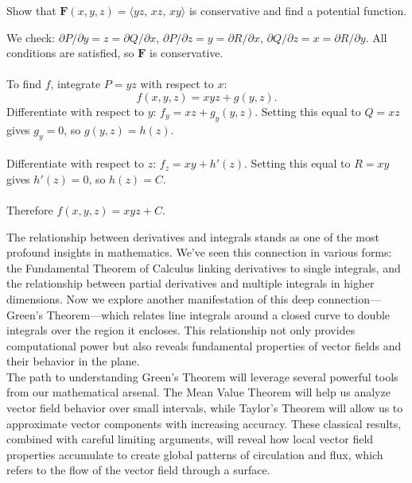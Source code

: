 \exampleline
\begin{example}
Show that \( \mathbf{F}(x,y,z) = \langle yz, \, xz, \, xy \rangle \) is conservative and find a potential function.

\begin{solution}
We check: \( \partial P/\partial y = z = \partial Q/\partial x \), \( \partial P/\partial z = y = \partial R/\partial x \), \( \partial Q/\partial z = x = \partial R/\partial y \). All conditions are satisfied, so \( \mathbf{F} \) is conservative.\\ \\
\noindent To find \( f \), integrate \( P = yz \) with respect to \( x \):
\[ f(x,y,z) = xyz + g(y,z). \]
Differentiate with respect to \( y \): \( f_y = xz + g_y(y,z) \). Setting this equal to \( Q = xz \) gives \( g_y = 0 \), so \( g(y,z) = h(z) \).\\ \\
\noindent Differentiate with respect to \( z \): \( f_z = xy + h'(z) \). Setting this equal to \( R = xy \) gives \( h'(z) = 0 \), so \( h(z) = C \).\\ \\
\noindent Therefore \( f(x,y,z) = xyz + C \).
\end{solution}
\end{example}
\exampleline


\newpage

  

\noindent The relationship between derivatives and integrals stands as one of the most profound insights in mathematics. We've seen this connection in various forms: the Fundamental Theorem of Calculus linking derivatives to single integrals, and the relationship between partial derivatives and multiple integrals in higher dimensions. Now we explore another manifestation of this deep connection—Green's Theorem—which relates line integrals around a closed curve to double integrals over the region it encloses. This relationship not only provides computational power but also reveals fundamental properties of vector fields and their behavior in the plane. \\

\noindent The path to understanding Green's Theorem will leverage several powerful tools from our mathematical arsenal. The Mean Value Theorem will help us analyze vector field behavior over small intervals, while Taylor's Theorem will allow us to approximate vector components with increasing accuracy. These classical results, combined with careful limiting arguments, will reveal how local vector field properties accumulate to create global patterns of circulation and flux, which refers to the flow of the vector field through a surface. \\

